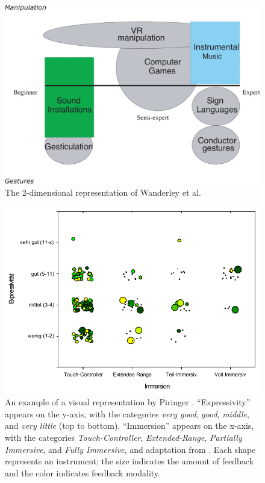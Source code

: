 \begin{figure}[t]
\centering
\centering
\includegraphics[width=\columnwidth]{figures/wanderley_et_al}
\caption{The 2-dimensional representation of Wanderley et al. \cite{Wanderley:2000}}
\label{Birnbaum:fig:wanderley}
\end{figure}

\begin{figure}[t]
\centering
\includegraphics[width=\columnwidth]{figures/piringer}
\caption{An example of a visual representation by Piringer \cite{Piringer:2001}. ``Expressivity'' appears on the y-axis, with the categories \emph{very good}, \emph{good}, \emph{middle}, and \emph{very little} (top to bottom). ``Immersion'' appears on the x-axis, with the categories \emph{Touch-Controller}, \emph{Extended-Range}, \emph{Partially Immersive}, and \emph{Fully Immersive}, and adaptation from \cite{Mulder:1998}. Each shape represents an instrument; the size indicates the amount of feedback and the color indicates feedback modality.}
\label{Birnbaum:fig:piringer}
\end{figure}

